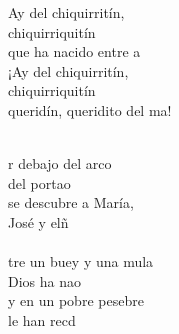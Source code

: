 \begin{cancion}[Chiquirritín][]%
	\begin{chorus}%
	Ay del chiquirritín,\\
chiquirriquitín\\
	que ha nacido entre a\\
¡Ay del chiquirritín, \\
chiquirriquitín\\
	queridín, queridito del ma!\\
	\end{chorus}%
	\jump\\
	r debajo del arco \\
	del portao\\
se descubre a María, \\
	José y elñ \\
\jump\\
	tre un buey y una mula\\
	Dios ha nao\\
y en un pobre pesebre \\
	le han recd\\
\end{cancion}%
